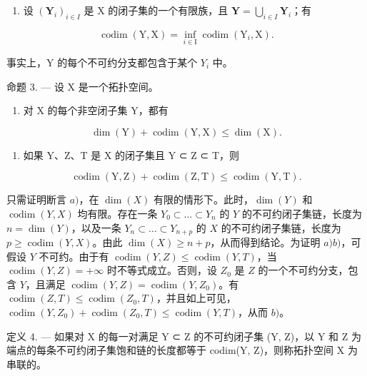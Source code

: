 \begin{enumerate}
\def\labelenumi{\arabic{enumi})}
\setcounter{enumi}{3}
\tightlist
\item
  设 \((\mathbf{Y}_i)_{i\in I}\) 是 X 的闭子集的一个有限族，且 \(\mathbf{Y} = \bigcup_{i\in I}\mathbf{Y}_i\)；有
\end{enumerate}

\[
\operatorname{codim} (\mathrm{Y}, \mathrm{X}) = \inf _ {i \in \mathrm{I}} \operatorname{codim} (\mathrm{Y} _ {i}, \mathrm{X}).
\]

事实上，Y 的每个不可约分支都包含于某个 \(Y_{i}\) 中。

命题 3. --- 设 X 是一个拓扑空间。

\begin{enumerate}
\def\labelenumi{\alph{enumi})}
\tightlist
\item
  对 X 的每个非空闭子集 Y，都有
\end{enumerate}

\[
\dim (\mathrm{Y}) + \operatorname{codim} (\mathrm{Y}, \mathrm{X}) \leqslant \dim (\mathrm{X}).
\]

\begin{enumerate}
\def\labelenumi{\alph{enumi})}
\setcounter{enumi}{1}
\tightlist
\item
  如果 Y、Z、T 是 X 的闭子集且 Y ⊂ Z ⊂ T，则
\end{enumerate}

\[
\operatorname{codim} (\mathrm{Y}, \mathrm{Z}) + \operatorname{codim} (\mathrm{Z}, \mathrm{T}) \leqslant \operatorname{codim} (\mathrm{Y}, \mathrm{T}).
\]

只需证明断言 \(a)\)，在 \(\dim(X)\) 有限的情形下。此时，\(\dim(Y)\) 和 \(\operatorname{codim}(Y, X)\) 均有限。存在一条 \(Y_0 \subset \ldots \subset Y_n\) 的 \(Y\) 的不可约闭子集链，长度为 \(n = \dim(Y)\)，以及一条 \(Y_n \subset \ldots \subset Y_{n+p}\) 的 \(X\) 的不可约闭子集链，长度为 \(p \geqslant \operatorname{codim}(Y, X)\)。由此 \(\dim(X) \geqslant n + p\)，从而得到结论。为证明 \(a)\)\(b)\)，可假设 \(Y\) 不可约。由于有 \(\operatorname{codim}(Y, Z) \leqslant \operatorname{codim}(Y, T)\)，当 \(\operatorname{codim}(Y, Z) = +\infty\) 时不等式成立。否则，设 \(Z_0\) 是 \(Z\) 的一个不可约分支，包含 \(Y\)，且满足 \(\operatorname{codim}(Y, Z) = \operatorname{codim}(Y, Z_0)\)。有 \(\operatorname{codim}(Z, T) \leqslant \operatorname{codim}(Z_0, T)\)，并且如上可见，\(\operatorname{codim}(Y, Z_0) + \operatorname{codim}(Z_0, T) \leqslant \operatorname{codim}(Y, T)\)，从而 \(b)\)。

定义 4. --- 如果对 X 的每一对满足 Y ⊂ Z 的不可约闭子集 (Y, Z)，以 Y 和 Z 为端点的每条不可约闭子集饱和链的长度都等于 codim(Y, Z)，则称拓扑空间 X 为串联的。


